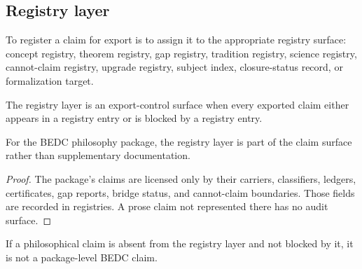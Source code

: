 \subsection{Registry layer}
\label{subsec:philosophy-registry-layer}

\begin{definition}
\label{def:philosophy-registering-for-export}
To register a claim for export is to assign it to the appropriate
registry surface: concept registry, theorem registry, gap registry,
tradition registry, science registry, cannot-claim registry, upgrade
registry, subject index, closure-status record, or formalization
target.
\end{definition}

\begin{definition}
\label{def:philosophy-export-control-surface}
The registry layer is an export-control surface when every exported
claim either appears in a registry entry or is blocked by a registry
entry.
\end{definition}

\begin{theorem}
\label{thm:philosophy-registry-layer-not-supplementary}
For the BEDC philosophy package, the registry layer is part of the
claim surface rather than supplementary documentation.
\end{theorem}
\begin{proof}
The package's claims are licensed only by their carriers,
classifiers, ledgers, certificates, gap reports, bridge status, and
cannot-claim boundaries. Those fields are recorded in registries. A
prose claim not represented there has no audit surface.
\end{proof}

\begin{corollary}
\label{cor:philosophy-no-registry-no-package-claim}
If a philosophical claim is absent from the registry layer and not
blocked by it, it is not a package-level BEDC claim.
\end{corollary}


